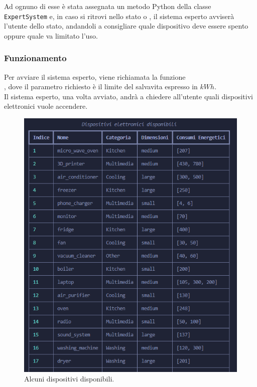 \documentclass[12pt, letterpaper]{article}
\begin{document}
\noindent Ad ognuno di esse è stata assegnata un metodo Python della classe \\
\texttt{ExpertSystem} e, in caso si ritrovi nello stato  o , il sistema esperto avviserà l'utente
dello stato, andandoli a consigliare quale dispositivo deve essere spento oppure quale va limitato l'uso.

\subsubsection{Funzionamento}

\noindent Per avviare il sistema esperto, viene richiamata la funzione \\
, dove il parametro richiesto è il
limite del salvavita espresso in $kWh$. \\

\noindent Il sistema esperto, una volta avviato, andrà a chiedere all'utente quali
dispositivi elettronici vuole accendere. \pagebreak

\begin{figure}[h]
      \centering
      \includegraphics[scale=0.7]{dispositivi-tabella.png}
      \caption{Alcuni dispositivi disponibili.}
\end{figure}
\end{document}
